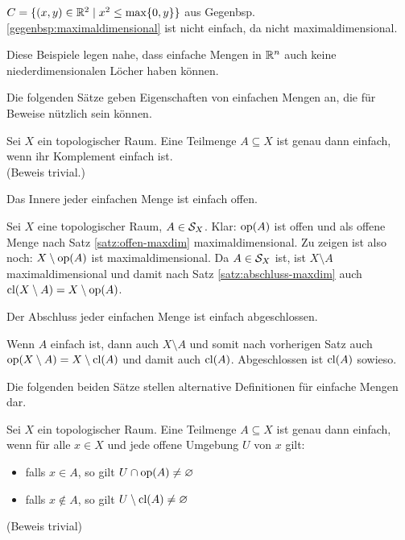 %
%
    \begin{gegenbsp}\label{gegenbsp:einfach-2}
        $C = \{(x,y) \in \mathbb{R}^2 \mid x^2 \leq \max\{0,y\}\}$ aus Gegenbsp. \ref{gegenbsp:maximaldimensional} ist nicht einfach, da nicht maximaldimensional.
    \end{gegenbsp}
%
    Diese Beispiele legen nahe, dass einfache Mengen in $\mathbb{R}^n$ auch keine niederdimensionalen Löcher haben können.
    
    Die folgenden Sätze geben Eigenschaften von einfachen Mengen an, die für Beweise nützlich sein können.
%
    \begin{satz}\label{satz:einf-komplement}
        Sei $X$ ein topologischer Raum. Eine Teilmenge $A \subseteq X$ ist genau dann einfach, wenn ihr Komplement einfach ist.\\
        (Beweis trivial.)
    \end{satz}
%    
%    
    \begin{satz}\label{satz:inneres-einf-offen}
        Das Innere jeder einfachen Menge ist einfach offen.
    \end{satz}
%    
    \begin{bew}
        Sei $X$ eine topologischer Raum, $A \in \mathcal{S}_X$. 
        Klar: $\text{op}(A)$ ist offen und als offene Menge nach Satz \ref{satz:offen-maxdim} maximaldimensional.
        Zu zeigen ist also noch: $X \setminus \text{op}(A)$ ist maximaldimensional.
        Da $A \in \mathcal{S}_X$ ist, ist $X \setminus A$ maximaldimensional und damit nach Satz \ref{satz:abschluss-maxdim} auch $\text{cl}(X \setminus A) = X \setminus \text{op}(A)$.
    \end{bew}
%    
%
    \begin{kor}
        Der Abschluss jeder einfachen Menge ist einfach abgeschlossen.
    \end{kor}
%    
    \begin{bew}
        Wenn $A$ einfach ist, dann auch $X \setminus A$ und somit nach vorherigen Satz auch $\text{op}(X \setminus A) = X \setminus \text{cl}(A)$ und damit auch $\text{cl}(A)$. 
        Abgeschlossen ist $\text{cl}(A)$ sowieso.
    \end{bew}
%
%
    Die folgenden beiden Sätze stellen alternative Definitionen für einfache Mengen dar.
    \begin{satz}
        Sei $X$ ein topologischer Raum. Eine Teilmenge $A \subseteq X$ ist genau dann einfach, wenn für alle $x \in X$ und jede offene Umgebung $U$ von $x$ gilt:
        \begin{itemize}
            \item falls $x \in A$, so gilt $U \cap \text{op}(A) \neq \varnothing$
            \item falls $x \notin A$, so gilt $U \setminus \text{cl}(A) \neq \varnothing$
        \end{itemize}
        (Beweis trivial)
    \end{satz}
